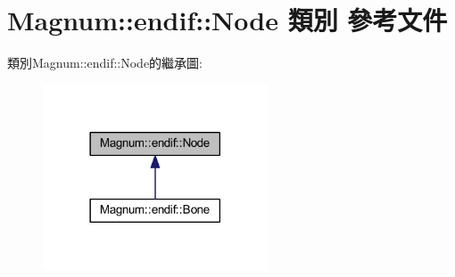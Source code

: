 \hypertarget{class_magnum_1_1endif_1_1_node}{}\section{Magnum\+:\+:endif\+:\+:Node 類別 參考文件}
\label{class_magnum_1_1endif_1_1_node}


類別\+Magnum\+:\+:endif\+:\+:Node的繼承圖\+:\nopagebreak
\begin{figure}[H]
\begin{center}
\leavevmode
\includegraphics[width=189pt]{class_magnum_1_1endif_1_1_node__inherit__graph}
\end{center}
\end{figure}
